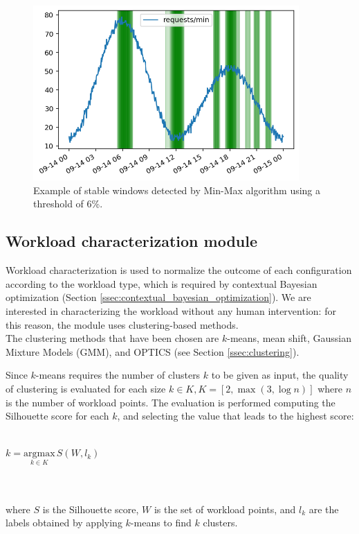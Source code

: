 \documentclass[a4paper, 12pt]{article} %
\begin{document}
	\begin{figure} \centering
		\includegraphics[width=4in]{img/stable_workload_threshold_example.png}
		\caption{Example of stable windows detected by Min-Max algorithm using a threshold of 6\%.}
		\label{fig:threshold_selection}
	\end{figure}


	
	\subsection{Workload characterization module}  \label{ssec:workload_characterization_module}
	Workload characterization is used to normalize the outcome of each configuration according to the workload type, which is required by contextual Bayesian optimization (Section \ref{ssec:contextual_bayesian_optimization}). We are interested in characterizing the workload without any human intervention: for this reason, the module uses clustering-based methods. \\
	The clustering methods that have been chosen are $k$-means, mean shift, Gaussian Mixture Models (GMM), and OPTICS (see Section \ref{ssec:clustering}).
	
	Since $k$-means requires the number of clusters $k$ to be given as input, the quality of clustering is evaluated for each size $k \in K, K = [2, \max (3, \log n)]$ where $n$ is the number of workload points. The evaluation is performed computing the Silhouette score for each $k$, and selecting the value that leads to the highest score:\\\\
	\centerline{
	$
		k = \underset{k \in K}{\mathrm{argmax}}\, S(W, l_k)
	$
	}\\\\
	where $S$ is the Silhouette score, $W$ is the set of workload points, and $l_k$ are the labels obtained by applying $k$-means to find $k$ clusters.
	
\end{document}
